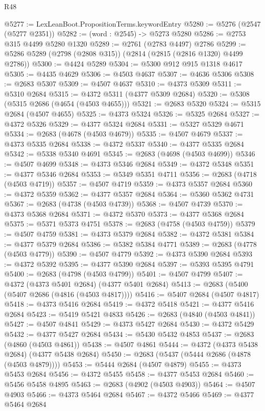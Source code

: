\begin{lexlean}{R48}
\begin{coremodule}
@5277 := LexLeanBoot.PropositionTerms.keywordEntry
@5280 := @5276 (@2547 (@5277 @2351))
@5282 := (word : @2545) -> @5273 @5280
@5286 := @2753 @315 @4499 @5280 @1320
@5289 := @2761 (@2783 @4497) @2786
@5299 := @5286 @5289 (@2798 (@2808 @315)) (@2814 (@2815 (@2816 @1320) @4499 @2786))
@5300 := @4424 @5289
@5304 := @5300 @912 @915 @1318 @4617
@5305 := @4435 @4629
@5306 := @4503 @4637
@5307 := @4636 @5306
@5308 := @2683 @5307
@5309 := @4507 @4637
@5310 := @4373 @5309
@5311 := @5310 @2684
@5315 := @4372 @5311 (@4377 @5309 @2684)
@5320 := @5308 (@5315 @2686 (@4654 (@4503 @4655)))
@5321 := @2683 @5320
@5324 := @5315 @2684 (@4507 @4655)
@5325 := @4373 @5324
@5326 := @5325 @2684
@5327 := @4372 @5326
@5329 := @4377 @5324 @2684
@5331 := @5327 @5329 @4671
@5334 := @2683 (@4678 (@4503 @4679))
@5335 := @4507 @4679
@5337 := @4373 @5335 @2684
@5338 := @4372 @5337
@5340 := @4377 @5335 @2684
@5342 := @5338 @5340 @4691
@5345 := @2683 (@4698 (@4503 @4699))
@5346 := @4507 @4699
@5348 := @4373 @5346 @2684
@5349 := @4372 @5348
@5351 := @4377 @5346 @2684
@5353 := @5349 @5351 @4711
@5356 := @2683 (@4718 (@4503 @4719))
@5357 := @4507 @4719
@5359 := @4373 @5357 @2684
@5360 := @4372 @5359
@5362 := @4377 @5357 @2684
@5364 := @5360 @5362 @4731
@5367 := @2683 (@4738 (@4503 @4739))
@5368 := @4507 @4739
@5370 := @4373 @5368 @2684
@5371 := @4372 @5370
@5373 := @4377 @5368 @2684
@5375 := @5371 @5373 @4751
@5378 := @2683 (@4758 (@4503 @4759))
@5379 := @4507 @4759
@5381 := @4373 @5379 @2684
@5382 := @4372 @5381
@5384 := @4377 @5379 @2684
@5386 := @5382 @5384 @4771
@5389 := @2683 (@4778 (@4503 @4779))
@5390 := @4507 @4779
@5392 := @4373 @5390 @2684
@5393 := @4372 @5392
@5395 := @4377 @5390 @2684
@5397 := @5393 @5395 @4791
@5400 := @2683 (@4798 (@4503 @4799))
@5401 := @4507 @4799
@5407 := @4372 (@4373 @5401 @2684) (@4377 @5401 @2684)
@5413 := @2683 (@5400 (@5407 @2686 (@4816 (@4503 @4817))))
@5416 := @5407 @2684 (@4507 @4817)
@5418 := @4373 @5416 @2684
@5419 := @4372 @5418
@5421 := @4377 @5416 @2684
@5423 := @5419 @5421 @4833
@5426 := @2683 (@4840 (@4503 @4841))
@5427 := @4507 @4841
@5429 := @4373 @5427 @2684
@5430 := @4372 @5429
@5432 := @4377 @5427 @2684
@5434 := @5430 @5432 @4853
@5437 := @2683 (@4860 (@4503 @4861))
@5438 := @4507 @4861
@5444 := @4372 (@4373 @5438 @2684) (@4377 @5438 @2684)
@5450 := @2683 (@5437 (@5444 @2686 (@4878 (@4503 @4879))))
@5453 := @5444 @2684 (@4507 @4879)
@5455 := @4373 @5453 @2684
@5456 := @4372 @5455
@5458 := @4377 @5453 @2684
@5460 := @5456 @5458 @4895
@5463 := @2683 (@4902 (@4503 @4903))
@5464 := @4507 @4903
@5466 := @4373 @5464 @2684
@5467 := @4372 @5466
@5469 := @4377 @5464 @2684

\end{coremodule}
\end{lexlean}
